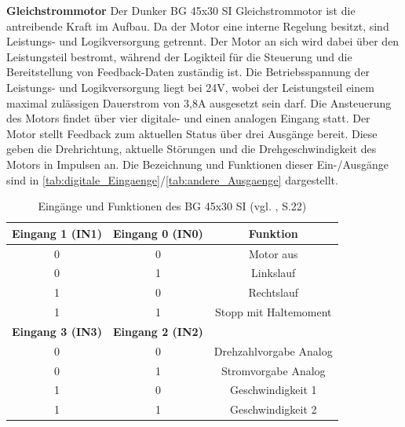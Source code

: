 \noindent\textbf{Gleichstrommotor}\newline
Der Dunker BG 45x30 SI Gleichstrommotor ist die antreibende Kraft im Aufbau. Da der Motor eine interne Regelung besitzt, sind Leistungs- und Logikversorgung getrennt. Der Motor an sich wird dabei über den Leistungsteil bestromt, während der Logikteil für die Steuerung und die Bereitstellung von Feedback-Daten zuständig ist. Die Betriebsspannung der Leistungs- und Logikversorgung liegt bei 24V, wobei der Leistungsteil einem maximal zulässigen Dauerstrom von 3,8A ausgesetzt sein darf. Die Ansteuerung des Motors findet über vier digitale- und einen analogen Eingang statt. Der Motor stellt Feedback zum aktuellen Status über drei Ausgänge bereit. Diese geben die Drehrichtung, aktuelle Störungen und die Drehgeschwindigkeit des Motors in Impulsen an. Die Bezeichnung und Funktionen dieser Ein-/Ausgänge sind in \autoref{tab:digitale_Eingaenge}/\autoref{tab:andere_Ausgaenge} dargestellt.\\
\begin{table}[H]
	\centering
	\begin{tabular}{|c|c|c|}
		\hline
		\textbf{Eingang 1 (IN1)} & \textbf{Eingang 0 (IN0)} & \textbf{Funktion}      \\ \hline
		0                        & 0                        & Motor aus              \\ \hline
		0                        & 1                        & Linkslauf              \\ \hline
		1                        & 0                        & Rechtslauf             \\ \hline
		1                        & 1                        & Stopp mit Haltemoment  \\ \hline
		\textbf{Eingang 3 (IN3)} & \textbf{Eingang 2 (IN2)} &                        \\ \hline
		0                        & 0                        & Drehzahlvorgabe Analog \\ \hline
		0                        & 1                        & Stromvorgabe Analog    \\ \hline
		1                        & 0                        & Geschwindigkeit 1      \\ \hline
		1                        & 1                        & Geschwindigkeit 2      \\ \hline
	\end{tabular}%
	\caption{Eingänge und Funktionen des BG 45x30 SI (vgl. \cite{BG_45}, S.22)}
	\label{tab:digitale_Eingaenge}
\end{table}
